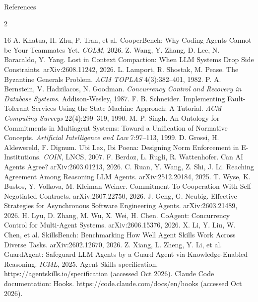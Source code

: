 \documentclass[aspectratio=169,11pt]{beamer}
\begin{document}
\begin{frame}{References}
  \tiny
  \begin{multicols}{2}
  \begin{thebibliography}{16}
     A. Khatua, H. Zhu, P. Tran, et al. CooperBench: Why Coding Agents Cannot be Your Teammates Yet. \textit{COLM}, 2026.
     Z. Wang, Y. Zhang, D. Lee, N. Baracaldo, Y. Yang. Lost in Context Compaction: When LLM Systems Drop Side Constraints. arXiv:2608.11242, 2026.
     L. Lamport, R. Shostak, M. Pease. The Byzantine Generals Problem. \textit{ACM TOPLAS} 4(3):382--401, 1982.
     P. A. Bernstein, V. Hadzilacos, N. Goodman. \textit{Concurrency Control and Recovery in Database Systems}. Addison-Wesley, 1987.
     F. B. Schneider. Implementing Fault-Tolerant Services Using the State Machine Approach: A Tutorial. \textit{ACM Computing Surveys} 22(4):299--319, 1990.
     M. P. Singh. An Ontology for Commitments in Multiagent Systems: Toward a Unification of Normative Concepts. \textit{Artificial Intelligence and Law} 7:97--113, 1999.
     D. Grossi, H. Aldewereld, F. Dignum. Ubi Lex, Ibi Poena: Designing Norm Enforcement in E-Institutions. \textit{COIN}, LNCS, 2007.
     F. Berdoz, L. Rugli, R. Wattenhofer. Can AI Agents Agree? arXiv:2603.01213, 2026.
     C. Ruan, Y. Wang, Z. Shi, J. Li. Reaching Agreement Among Reasoning LLM Agents. arXiv:2512.20184, 2025.
     T. Wyse, K. Bustos, Y. Volkova, M. Kleiman-Weiner. Commitment To Cooperation With Self-Negotiated Contracts. arXiv:2607.22750, 2026.
     J. Geng, G. Neubig. Effective Strategies for Asynchronous Software Engineering Agents. arXiv:2603.21489, 2026.
     H. Lyu, D. Zhang, M. Wu, X. Wei, H. Chen. CoAgent: Concurrency Control for Multi-Agent Systems. arXiv:2606.15376, 2026.
     X. Li, Y. Liu, W. Chen, et al. SkillsBench: Benchmarking How Well Agent Skills Work Across Diverse Tasks. arXiv:2602.12670, 2026.
     Z. Xiang, L. Zheng, Y. Li, et al. GuardAgent: Safeguard LLM Agents by a Guard Agent via Knowledge-Enabled Reasoning. \textit{ICML}, 2025.
     Agent Skills specification. https://agentskills.io/specification (accessed Oct 2026).
     Claude Code documentation: Hooks. https://code.claude.com/docs/en/hooks (accessed Oct 2026).
  \end{thebibliography}
  \end{multicols}
\end{frame}
\end{document}
